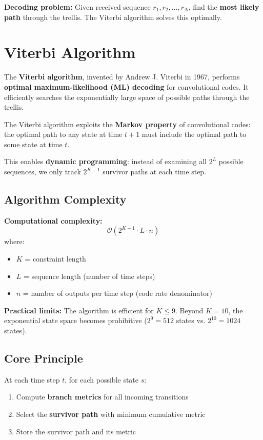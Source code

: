 \textbf{Decoding problem:} Given received sequence $r_1, r_2, \ldots, r_N$, find the \textbf{most likely path} through the trellis. The Viterbi algorithm solves this optimally.

\section{Viterbi Algorithm}

The \textbf{Viterbi algorithm}, invented by Andrew J. Viterbi in 1967, performs \textbf{optimal maximum-likelihood (ML) decoding} for convolutional codes. It efficiently searches the exponentially large space of possible paths through the trellis.

\begin{keyconcept}
The Viterbi algorithm exploits the \textbf{Markov property} of convolutional codes: the optimal path to any state at time $t+1$ must include the optimal path to some state at time $t$.

This enables \textbf{dynamic programming}: instead of examining all $2^L$ possible sequences, we only track $2^{K-1}$ survivor paths at each time step.
\end{keyconcept}

\subsection{Algorithm Complexity}

\textbf{Computational complexity:}
\begin{equation}
\mathcal{O}(2^{K-1} \cdot L \cdot n)
\label{eq:viterbi-complexity}
\end{equation}
where:
\begin{itemize}
\item $K$ = constraint length
\item $L$ = sequence length (number of time steps)
\item $n$ = number of outputs per time step (code rate denominator)
\end{itemize}

\textbf{Practical limits:} The algorithm is efficient for $K \leq 9$. Beyond $K=10$, the exponential state space becomes prohibitive ($2^9 = 512$ states vs. $2^{10} = 1024$ states).

\subsection{Core Principle}

At each time step $t$, for each possible state $s$:
\begin{enumerate}
\item Compute \textbf{branch metrics} for all incoming transitions
\item Select the \textbf{survivor path} with minimum cumulative metric
\item Store the survivor path and its metric
\end{enumerate}

